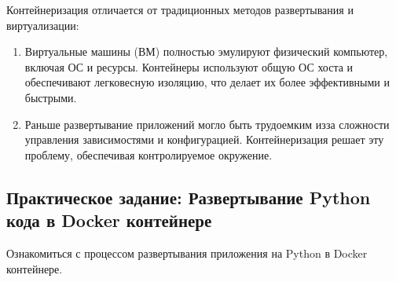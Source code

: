 \documentclass[letterpaper,10pt,russian]{sphinxmanual}
\begin{document}
\sphinxAtStartPar
{}

\sphinxAtStartPar
Контейнеризация отличается от традиционных методов развертывания и виртуализации:
\begin{enumerate}
%
\item {} 
\sphinxAtStartPar
{} Виртуальные машины (ВМ) полностью эмулируют физический компьютер, включая ОС и ресурсы. Контейнеры используют общую ОС хоста и обеспечивают легковесную изоляцию, что делает их более эффективными и быстрыми.

\item {} 
\sphinxAtStartPar
{} Раньше развертывание приложений могло быть трудоемким из\sphinxhyphen{}за сложности управления зависимостями и конфигурацией. Контейнеризация решает эту проблему, обеспечивая контролируемое окружение.

\end{enumerate}


\subsection{Практическое задание: Развертывание Python кода в Docker контейнере}
\label{\detokenize{educational_materials/docker_base/content:python-docker}}
\sphinxAtStartPar
{} Ознакомиться с процессом развертывания приложения на Python в Docker контейнере.
\end{document}
